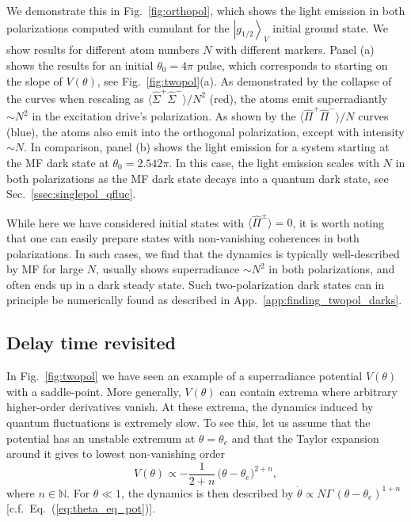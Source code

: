 \documentclass[aps,prx,superscriptaddress,twocolumn,notitlepage,nofootinbib,longbibliography]{revtex4-2}
\newcommand{\ket}[1]{\left|#1\right>}
\begin{document}
We demonstrate this in Fig.~\ref{fig:orthopol}, which shows the light emission in both polarizations computed with cumulant for the $\ket{g_{1/2}}_V$ initial ground state. We show results for different atom numbers $N$ with different markers. Panel (a) shows the results for an initial $\theta_0=4\pi$ pulse, which corresponds to starting on the slope of $V(\theta)$, see Fig.~\ref{fig:twopol}(a). As demonstrated by the collapse of the curves when rescaling as $\langle \hat{\Sigma}^+\hat{\Sigma}^- \rangle/N^2$ (red), the atoms emit superradiantly $\sim N^2$ in the excitation drive's polarization. As shown by the $\langle \hat{\Pi}^+\hat{\Pi}^- \rangle/N$ curves (blue), the atoms also emit into the orthogonal polarization, except with intensity $\sim N$. In comparison, panel (b) shows the light emission for a system starting at the MF dark state at $\theta_0=2.542\pi$. In this case, the light emission scales with $N$ in both polarizations as the MF dark state decays into a quantum dark state, see Sec.~\ref{ssec:singlepol_qfluc}.

While here we have considered initial states with $\langle \hat{\Pi}^\pm \rangle=0$, it is worth noting that one can easily prepare states with non-vanishing coherences in both polarizations. In such cases, we find that the dynamics is typically well-described by MF for large $N$, usually shows superradiance $\sim N^2$ in both polarizations, and often ends up in a dark steady state. Such two-polarization dark states can in principle be numerically found as described in App.~\ref{app:finding_twopol_darks}.










\subsection{Delay time revisited\label{sec:time_delay}}

In Fig.~\ref{fig:twopol} we have seen an example of a superradiance potential $V(\theta)$ with a saddle-point.
More generally, $V(\theta)$ can contain extrema where arbitrary higher-order derivatives vanish. At these extrema, the dynamics induced by quantum fluctuations is extremely slow.
To see this, let us assume that the potential has an unstable extremum at $\theta=\theta_e$ and that the Taylor expansion around it gives to lowest non-vanishing order
\begin{equation}
	V(\theta)\propto -\frac{1}{2+n}\, \big(\theta-\theta_e\big)^{2+n},
\end{equation}
where $n\in\mathbb{N}$.
For $\theta\ll1$, the dynamics is then described by $\dot{\theta} \propto N\Gamma\, (\theta-\theta_e)^{1+n}$ [c.f.~Eq.~(\ref{eq:theta_eq_pot})].
\end{document}
